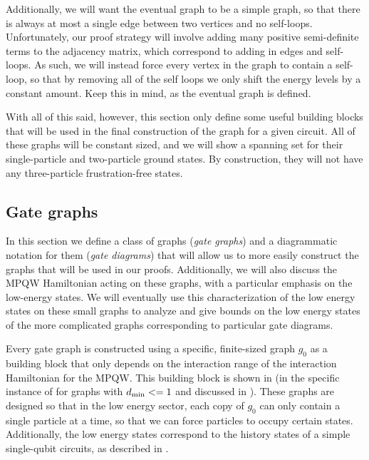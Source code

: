 \documentclass[../thesis-main/thesis-main]{subfiles}
\begin{document}
Additionally, we will want the eventual graph to be a simple graph, so that there is always at most a single edge between two vertices and no self-loops.  Unfortunately, our proof strategy will involve adding many positive semi-definite terms to the adjacency matrix, which correspond to adding in edges and self-loops.  As such, we will instead force every vertex in the graph to contain a self-loop, so that by removing all of the self loops we only shift the energy levels by a constant amount.  Keep this in mind, as the eventual graph is defined.

With all of this said, however, this section only define some useful building blocks that will be used in the final construction of the graph for a given circuit.  All of these graphs will be constant sized, and we will show a spanning set for their single-particle and two-particle ground states.  By construction, they will not have any three-particle frustration-free states.

\subsection{Gate graphs}\label{sec:gate_graphs}


In this section we define a class of graphs (\emph{gate graphs}) and a diagrammatic notation for them (\emph{gate diagrams}) that will allow us to more easily construct the graphs that will be used in our proofs.  Additionally, we will also discuss the MPQW Hamiltonian acting on these graphs, with a particular emphasis on the low-energy states.  We will eventually use this characterization of the low energy states on these small graphs to analyze and give bounds on the low energy states of the more complicated graphs corresponding to particular gate diagrams.

Every gate graph is constructed using a specific, finite-sized graph $g_{0}$ as a building block that only depends on the interaction range of the interaction Hamiltonian for the MPQW.  This building block is shown in  (in the specific instance of for graphs with $d_{\text{min}} <= 1$ and discussed in ).  These graphs are designed so that in the low energy sector, each copy of $g_0$ can only contain a single particle at a time, so that we can force particles to occupy certain states.  Additionally, the low energy states correspond to the history states of a simple single-qubit circuits, as described in .
\end{document}
